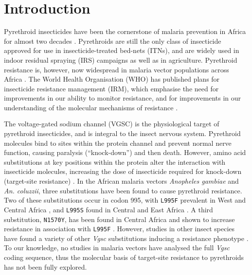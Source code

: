 \documentclass[a4paper,11pt,abstracton,hidelinks]{scrartcl}
\begin{document}
\section*{Introduction}


Pyrethroid insecticides have been the cornerstone of malaria prevention in Africa for almost two decades \cite{Bhatt2015}.
%
Pyrethroids are still the only class of insecticide approved for use in insecticide-treated bed-nets (ITNs), and are widely used in indoor residual spraying (IRS) campaigns as well as in agriculture.
%
Pyrethroid resistance is, however, now widespread in malaria vector populations across Africa \cite{Hemingway2016}.
%
The World Health Organisation (WHO) has published plans for insecticide resistance management (IRM), which emphasise the need for improvements in our ability to monitor resistance, and for improvements in our understanding of the molecular mechanisms of resistance \cite{WorldHealthOrganization2012}.


The voltage-gated sodium channel (VGSC) is the physiological target of pyrethroid insecticides, and is integral to the insect nervous system. 
%
Pyrethroid molecules bind to sites within the protein channel and prevent normal nerve function, causing paralysis (``knock-down'') and then death. 
%
However, amino acid substitutions at key positions within the protein alter the interaction with insecticide molecules, increasing the dose of insecticide required for knock-down (target-site resistance) \cite{Davies2007a}. 
%
In the African malaria vectors \textit{Anopheles gambiae} and \textit{An. coluzzii}, three substitutions have been found to cause pyrethroid resistance. 
%
Two of these substitutions occur in codon 995\footnotemark, with \texttt{L995F} prevalent in West and Central Africa \cite{Martinez-Torres1998,Silva2014}, and \texttt{L995S} found in Central and East Africa \cite{Ranson2000,Silva2014}. 
%
%
A third substitution, \texttt{N1570Y}, has been found in Central Africa and shown to increase resistance in association with \texttt{L995F} \cite{Jones2012}.
%
However, studies in other insect species have found a variety of other \emph{Vgsc} substitutions inducing a resistance phenotype \cite{Davies2007b,Rinkevich2013,Dong2014}. 
%
To our knowledge, no studies in malaria vectors have analysed the full \emph{Vgsc} coding sequence, thus the molecular basis of target-site resistance to pyrethroids has not been fully explored.
\end{document}
